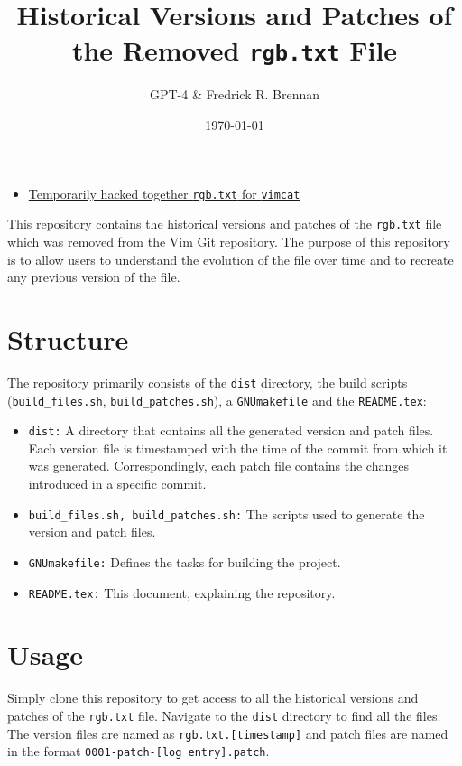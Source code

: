 \documentclass{article}
\title{Historical Versions and Patches of the Removed \texttt{rgb.txt} File}
\author{GPT-4 \& Fredrick R. Brennan}
\date{\today}
\begin{document}
\maketitle

\begin{itemize}
	\item \href{rgb.txt}{Temporarily hacked together \texttt{rgb.txt} for \texttt{vimcat}}
\end{itemize}

This repository contains the historical versions and patches of the \texttt{rgb.txt} file which was removed from the Vim Git repository. The purpose of this repository is to allow users to understand the evolution of the file over time and to recreate any previous version of the file.

\section*{Structure}

The repository primarily consists of the \texttt{dist} directory, the build scripts (\texttt{build\_files.sh}, \texttt{build\_patches.sh}), a \texttt{GNUmakefile} and the \texttt{README.tex}:

\begin{itemize}
    \item \texttt{dist:} A directory that contains all the generated version and patch files. Each version file is timestamped with the time of the commit from which it was generated. Correspondingly, each patch file contains the changes introduced in a specific commit.
    \item \texttt{build\_files.sh, build\_patches.sh:} The scripts used to generate the version and patch files.
    \item \texttt{GNUmakefile:} Defines the tasks for building the project.
    \item \texttt{README.tex:} This document, explaining the repository.
\end{itemize}

\section*{Usage}

Simply clone this repository to get access to all the historical versions and patches of the \texttt{rgb.txt} file. Navigate to the \texttt{dist} directory to find all the files. The version files are named as \texttt{rgb.txt.[timestamp]} and patch files are named in the format \texttt{0001-patch-[log entry].patch}.
\end{document}
